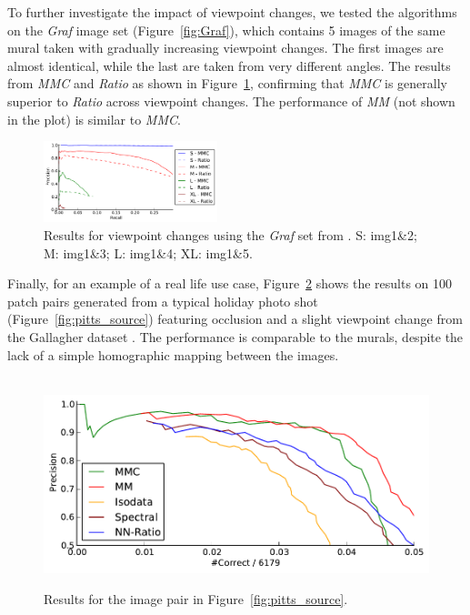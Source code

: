\documentclass{article}
\begin{document}
To further investigate the impact of viewpoint changes, we tested the 
algorithms on the \emph{Graf} image set (Figure~\ref{fig:Graf}), which 
contains 5 images of the same mural taken with gradually increasing 
viewpoint changes.  The first images are almost identical, while the 
last are taken from very different angles. The results from   \emph{MMC} 
and \emph{Ratio} as shown in Figure~\ref{fig:result_viewpoint}, 
confirming that \emph{MMC} is generally superior to \emph{Ratio} across 
viewpoint changes.
The performance of \emph{MM} (not shown in the plot) is similar to 
\emph{MMC}.

\begin{figure}[htb]
	\centering
	\includegraphics[width=0.45\textwidth]{images/result_viewpoint}
	\caption{Results for viewpoint changes using the \emph{Graf} set from 
		\cite{mikolajczyk2005performance}.  S: img1\&2; M: img1\&3; L: img1\&4; XL: img1\&5.}
	\label{fig:result_viewpoint}
\end{figure}


Finally, for an example of a real life use case, Figure~\ref{fig:result_pitts} 
shows the results on 100 patch pairs generated 
from a typical holiday photo shot (Figure~\ref{fig:pitts_source}) featuring occlusion and a slight viewpoint 
change from the Gallagher dataset \cite{gallagher2008}.  The performance is comparable to the murals, despite the lack of a simple homographic mapping between the images.


\begin{figure}[htb]
		~%
			\centering
			\includegraphics[width=0.6\columnwidth]{images/result_pitts}
	\caption{Results for the image pair in Figure~\ref{fig:pitts_source}.}
	\label{fig:result_pitts}
\end{figure}
\end{document}
